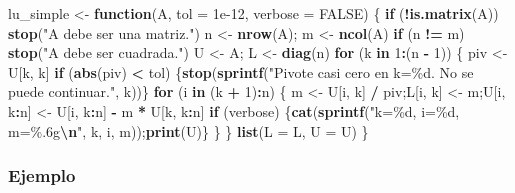 \documentclass[
]{book}
\newenvironment{Shaded}{\begin{snugshade}}{\end{snugshade}}
\newcommand{\AttributeTok}[1]{\textcolor[rgb]{0.13,0.29,0.53}{#1}}
\newcommand{\ConstantTok}[1]{\textcolor[rgb]{0.56,0.35,0.01}{#1}}
\newcommand{\ControlFlowTok}[1]{\textcolor[rgb]{0.13,0.29,0.53}{\textbf{#1}}}
\newcommand{\DecValTok}[1]{\textcolor[rgb]{0.00,0.00,0.81}{#1}}
\newcommand{\FloatTok}[1]{\textcolor[rgb]{0.00,0.00,0.81}{#1}}
\newcommand{\FunctionTok}[1]{\textcolor[rgb]{0.13,0.29,0.53}{\textbf{#1}}}
\newcommand{\NormalTok}[1]{#1}
\newcommand{\OtherTok}[1]{\textcolor[rgb]{0.56,0.35,0.01}{#1}}
\newcommand{\SpecialCharTok}[1]{\textcolor[rgb]{0.81,0.36,0.00}{\textbf{#1}}}
\newcommand{\StringTok}[1]{\textcolor[rgb]{0.31,0.60,0.02}{#1}}
\begin{document}
\begin{Shaded}
\begin{Highlighting}[]
\NormalTok{lu\_simple }\OtherTok{\textless{}{-}} \ControlFlowTok{function}\NormalTok{(A, }\AttributeTok{tol =} \FloatTok{1e{-}12}\NormalTok{, }\AttributeTok{verbose =} \ConstantTok{FALSE}\NormalTok{) \{}
  \ControlFlowTok{if}\NormalTok{ (}\SpecialCharTok{!}\FunctionTok{is.matrix}\NormalTok{(A)) }\FunctionTok{stop}\NormalTok{(}\StringTok{"A debe ser una matriz."}\NormalTok{)}
\NormalTok{  n }\OtherTok{\textless{}{-}} \FunctionTok{nrow}\NormalTok{(A); m }\OtherTok{\textless{}{-}} \FunctionTok{ncol}\NormalTok{(A)}
  \ControlFlowTok{if}\NormalTok{ (n }\SpecialCharTok{!=}\NormalTok{ m) }\FunctionTok{stop}\NormalTok{(}\StringTok{"A debe ser cuadrada."}\NormalTok{)}
\NormalTok{  U }\OtherTok{\textless{}{-}}\NormalTok{ A;  L }\OtherTok{\textless{}{-}} \FunctionTok{diag}\NormalTok{(n)}
  \ControlFlowTok{for}\NormalTok{ (k }\ControlFlowTok{in} \DecValTok{1}\SpecialCharTok{:}\NormalTok{(n }\SpecialCharTok{{-}} \DecValTok{1}\NormalTok{)) \{}
\NormalTok{    piv }\OtherTok{\textless{}{-}}\NormalTok{ U[k, k]}
    \ControlFlowTok{if}\NormalTok{ (}\FunctionTok{abs}\NormalTok{(piv) }\SpecialCharTok{\textless{}}\NormalTok{ tol) \{}\FunctionTok{stop}\NormalTok{(}\FunctionTok{sprintf}\NormalTok{(}\StringTok{"Pivote casi cero en k=\%d. No se puede continuar."}\NormalTok{, k))\}}
    \ControlFlowTok{for}\NormalTok{ (i }\ControlFlowTok{in}\NormalTok{ (k }\SpecialCharTok{+} \DecValTok{1}\NormalTok{)}\SpecialCharTok{:}\NormalTok{n) \{}
\NormalTok{      m }\OtherTok{\textless{}{-}}\NormalTok{ U[i, k] }\SpecialCharTok{/}\NormalTok{ piv;L[i, k] }\OtherTok{\textless{}{-}}\NormalTok{ m;U[i, k}\SpecialCharTok{:}\NormalTok{n] }\OtherTok{\textless{}{-}}\NormalTok{ U[i, k}\SpecialCharTok{:}\NormalTok{n] }\SpecialCharTok{{-}}\NormalTok{ m }\SpecialCharTok{*}\NormalTok{ U[k, k}\SpecialCharTok{:}\NormalTok{n]}
      \ControlFlowTok{if}\NormalTok{ (verbose) \{}\FunctionTok{cat}\NormalTok{(}\FunctionTok{sprintf}\NormalTok{(}\StringTok{"k=\%d, i=\%d, m=\%.6g}\SpecialCharTok{\textbackslash{}n}\StringTok{"}\NormalTok{, k, i, m));}\FunctionTok{print}\NormalTok{(U)\}}
\NormalTok{    \}}
\NormalTok{  \}}
  \FunctionTok{list}\NormalTok{(}\AttributeTok{L =}\NormalTok{ L, }\AttributeTok{U =}\NormalTok{ U)}
\NormalTok{\}}
\end{Highlighting}
\end{Shaded}

\subsubsection{Ejemplo}\label{ejemplo-4}
\end{document}
